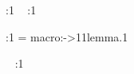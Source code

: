 \begingroup
  \edef\HyRef@currentHtag{\lemmaautorefname~}%
  \Hy@safe@activesfalse %
  \hyper@@link{%
    \expandafter\@fifthoffive\r@lem:1\@empty\@empty\@empty
  }{%
    \expandafter\@fourthoffive\r@lem:1\@empty\@empty\@empty
  }{%
    \HyRef@currentHtag
    \expandafter\@firstoffive\r@lem:1\@empty\@empty\@empty
    \null
  }%
\endgroup

\def\hyper@@link{\let\Hy@reserved@a\relax
  \@ifnextchar[{\hyper@link@}{\hyper@link@[link]}%
}

\begingroup
  \edef\HyRef@currentHtag{\lemmaautorefname~}%
  \hyper@link@[link]
    {\expandafter\@fifthoffive\r@lem:1\@empty\@empty\@empty}
    {\expandafter\@fourthoffive\r@lem:1\@empty\@empty\@empty}
    {%
      \HyRef@currentHtag
      \expandafter\@firstoffive\r@lem:1\@empty\@empty\@empty
      \null
    }%
\endgroup

\def\hyper@link@[#1]#2#3#4{%
  \ltx@ifempty{#4}{%
    \Hy@Warning{Suppressing empty link}%
  }{%
    \begingroup
      \protected@edef\Hy@tempa{#2}%
      \edef\Hy@tempb{#3}%
      \ifx\Hy@tempa\ltx@empty
        \ifx\Hy@tempb\ltx@empty
          \Hy@Warning{Suppressing link with empty target}%
          \toks@{%
            \endgroup
            \ltx@secondoftwo
          }%
        \else
          \toks@{%
            \endgroup
            \hyper@link{#1}%
          }%
        \fi
      \else
        \toks@{%
          \endgroup
          \expandafter\hyper@readexternallink#2\\{#1}%
        }%
      \fi
      \Hy@safe@activesfalse
      \toks@\expandafter{%
        \the\expandafter\toks@
        \expandafter{\Hy@tempb}{#4}%
      }%
    \the\toks@
  }%
}

\r@lem:1 = macro:->{1}{1}{}{lemma.1}{}

\begingroup
  \edef\HyRef@currentHtag{\lemmaautorefname~}%
      \begingroup
        \protected@edef\Hy@tempa{}%
        \edef\Hy@tempb{lemma.1}%
      \endgroup {}
\endgroup

\begingroup
  \edef\HyRef@currentHtag{\lemmaautorefname~}%
    {%
      \HyRef@currentHtag
      \expandafter\@firstoffive\r@lem:1\@empty\@empty\@empty
      \null
    }%
\endgroup

\def\hyper@link#1#2#3{%
  \Hy@VerboseLinkStart{#1}{#2}%
  \ltx@IfUndefined{@#1bordercolor}{%
    \let\CurrentBorderColor\relax
  }{%
    \edef\CurrentBorderColor{\csname @#1bordercolor\endcsname}%
  }%
  \find@pdflink{#1}{#2}#3\Hy@xspace@end
  \close@pdflink
}
